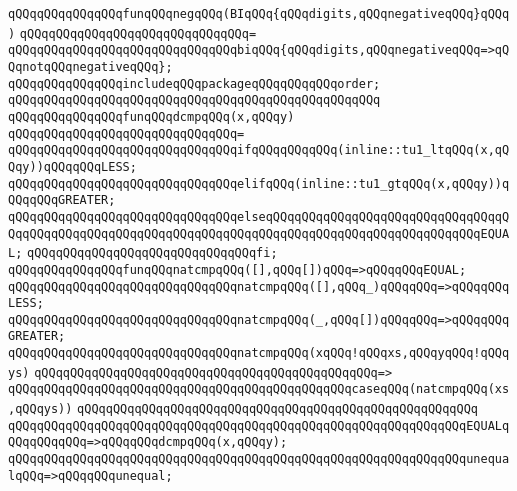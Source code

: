 \newline
\verb|qQQqqQQqqQQqqQQqfunqQQqnegqQQq(BIqQQq{qQQqdigits,qQQqnegativeqQQq}qQQq)|\newline
\verb|qQQqqQQqqQQqqQQqqQQqqQQqqQQqqQQq=|\newline
\verb|qQQqqQQqqQQqqQQqqQQqqQQqqQQqqQQqbiqQQq{qQQqdigits,qQQqnegativeqQQq=>qQQqnotqQQqnegativeqQQq};|\newline
\newline
\verb|qQQqqQQqqQQqqQQqincludeqQQqpackageqQQqqQQqqQQqorder;|\newline
\verb|qQQqqQQqqQQqqQQqqQQqqQQqqQQqqQQqqQQqqQQqqQQqqQQqqQQq|\newline
\verb|qQQqqQQqqQQqqQQqfunqQQqdcmpqQQq(x,qQQqy)|\newline
\verb|qQQqqQQqqQQqqQQqqQQqqQQqqQQqqQQq=|\newline
\verb|qQQqqQQqqQQqqQQqqQQqqQQqqQQqqQQqifqQQqqQQqqQQq(inline::tu1_ltqQQq(x,qQQqy))qQQqqQQqLESS;|\newline
\verb|qQQqqQQqqQQqqQQqqQQqqQQqqQQqqQQqelifqQQq(inline::tu1_gtqQQq(x,qQQqy))qQQqqQQqGREATER;|\newline
\verb|qQQqqQQqqQQqqQQqqQQqqQQqqQQqqQQqelseqQQqqQQqqQQqqQQqqQQqqQQqqQQqqQQqqQQqqQQqqQQqqQQqqQQqqQQqqQQqqQQqqQQqqQQqqQQqqQQqqQQqqQQqqQQqqQQqqQQqEQUAL;|\newline
\verb|qQQqqQQqqQQqqQQqqQQqqQQqqQQqqQQqfi;|\newline
\newline
\verb|qQQqqQQqqQQqqQQqfunqQQqnatcmpqQQq([],qQQq[])qQQq=>qQQqqQQqEQUAL;|\newline
\verb|qQQqqQQqqQQqqQQqqQQqqQQqqQQqqQQqnatcmpqQQq([],qQQq_)qQQqqQQq=>qQQqqQQqLESS;|\newline
\verb|qQQqqQQqqQQqqQQqqQQqqQQqqQQqqQQqnatcmpqQQq(_,qQQq[])qQQqqQQq=>qQQqqQQqGREATER;|\newline
\newline
\verb|qQQqqQQqqQQqqQQqqQQqqQQqqQQqqQQqnatcmpqQQq(xqQQq!qQQqxs,qQQqyqQQq!qQQqys)|\newline
\verb|qQQqqQQqqQQqqQQqqQQqqQQqqQQqqQQqqQQqqQQqqQQqqQQq=>|\newline
\verb|qQQqqQQqqQQqqQQqqQQqqQQqqQQqqQQqqQQqqQQqqQQqqQQqcaseqQQq(natcmpqQQq(xs,qQQqys))|\newline
\verb|qQQqqQQqqQQqqQQqqQQqqQQqqQQqqQQqqQQqqQQqqQQqqQQqqQQqqQQq|\newline
\verb|qQQqqQQqqQQqqQQqqQQqqQQqqQQqqQQqqQQqqQQqqQQqqQQqqQQqqQQqqQQqqQQqEQUALqQQqqQQqqQQq=>qQQqqQQqdcmpqQQq(x,qQQqy);|\newline
\verb|qQQqqQQqqQQqqQQqqQQqqQQqqQQqqQQqqQQqqQQqqQQqqQQqqQQqqQQqqQQqqQQqunequalqQQq=>qQQqqQQqunequal;|\newline
